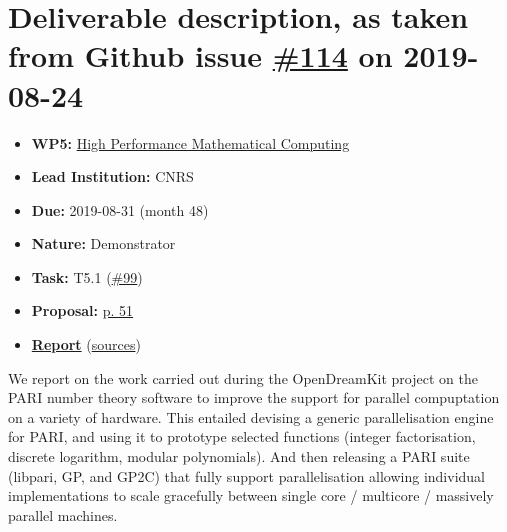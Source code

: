 \hypertarget{deliverable-description-as-taken-from-github-issue-114-on-2019-08-24}{%
\section*{\texorpdfstring{Deliverable description, as taken from Github
issue
\href{https://github.com/OpenDreamKit/OpenDreamKit/issues/114}{\#114} on
2019-08-24}{Deliverable description, as taken from Github issue \#114 on 2019-08-24}}\label{deliverable-description-as-taken-from-github-issue-114-on-2019-08-24}}

\begin{itemize}
\tightlist
\item
  \textbf{WP5:}
  \href{https://github.com/OpenDreamKit/OpenDreamKit/tree/master/WP5}{High
  Performance Mathematical Computing}
\item
  \textbf{Lead Institution:} CNRS
\item
  \textbf{Due:} 2019-08-31 (month 48)
\item
  \textbf{Nature:} Demonstrator
\item
  \textbf{Task:} T5.1
  (\href{https://github.com/OpenDreamKit/OpenDreamKit/issues/99}{\#99})
\item
  \textbf{Proposal:}
  \href{https://github.com/OpenDreamKit/OpenDreamKit/raw/master/Proposal/proposal-www.pdf}{p.
  51}
\item
  \textbf{\href{https://github.com/OpenDreamKit/OpenDreamKit/raw/master/WP5/D5.16/report-final.pdf}{Report}}
  (\href{https://github.com/OpenDreamKit/OpenDreamKit/raw/master/WP5/D5.16/}{sources})
\end{itemize}

We report on the work carried out during the OpenDreamKit project on the
PARI number theory software to improve the support for parallel
compuptation on a variety of hardware. This entailed devising a generic
parallelisation engine for PARI, and using it to prototype selected
functions (integer factorisation, discrete logarithm, modular
polynomials). And then releasing a PARI suite (libpari, GP, and GP2C)
that fully support parallelisation allowing individual implementations
to scale gracefully between single core / multicore / massively parallel
machines.
